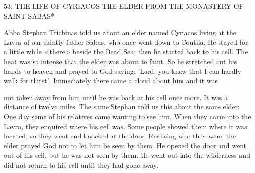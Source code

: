 53, THE LIFE OF CYRIACOS THE ELDER
FROM THE MONASTERY OF SAINT SABAS*

Abba Stephan Trichinas told us about an elder named Cyriacos
living at the Lavra of our saintly father Sabas, who once went down
to Coutila.
He stayed for a little while <there> beside the Dead Sea;
then he started back to his cell.
The heat was so intense that the
elder was about to faint.
So he stretched out his hands to heaven
and prayed to God saying: 'Lord, you know that I can hardly walk
for thirst', Immediately there came a cloud about him and it was

not taken away from him until he was back at his cell once more.
It was a distance of twelve miles.
The same Stephan told us this
about the same elder: One day some of his relatives came wanting
to see him.
When they came into the Lavra, they enquired where his
cell was.
Some people showed them where it was located, so they
went and knocked at the door.
Realising who they were, the elder
prayed God not to let him be seen by them.
He opened the door
and went out of his cell, but he was not seen by them.
He went out
into the wilderness and did not return to his cell until they had gone
away.

